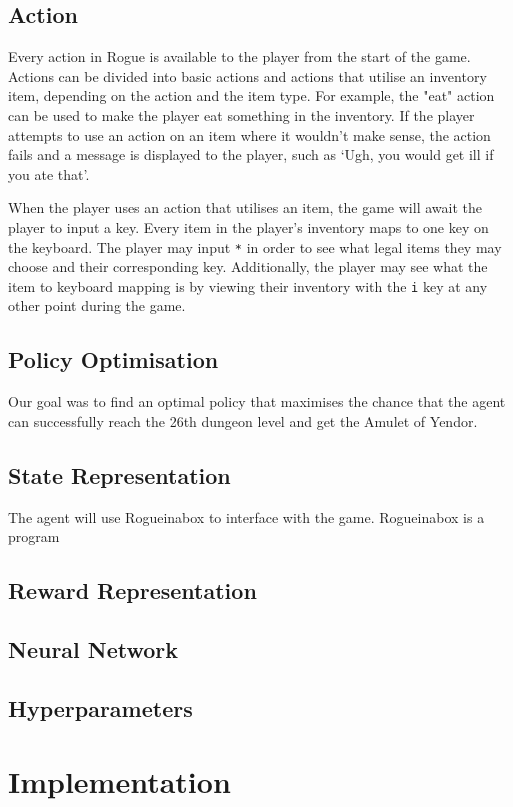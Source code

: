 \documentclass[11pt,a4paper]{article}
\begin{document}
    \subsection{Action}
    Every action in Rogue is available to the player from the start of the game. Actions can be divided into basic actions and actions that utilise an inventory item, depending on the action and the item type. For example, the "eat" action can be used to make the player eat something in the inventory. If the player attempts to use an action on an item where it wouldn't make sense, the action fails and a message is displayed to the player, such as `Ugh, you would get ill if you ate that'.

    When the player uses an action that utilises an item, the game will await the player to input a key. Every item in the player's inventory maps to one key on the keyboard. The player may input \texttt{*} in order to see what legal items they may choose and their corresponding key. Additionally, the player may see what the item to keyboard mapping is by viewing their inventory with the \texttt{i} key at any other point during the game.

    \subsection{Policy Optimisation}
    Our goal was to find an optimal policy that maximises the chance that the agent can successfully reach the 26th dungeon level and get the Amulet of Yendor.
    \subsection{State Representation}
    The agent will use Rogueinabox to interface with the game. Rogueinabox is a program
    \subsection{Reward Representation}
    \subsection{Neural Network}

    \subsection{Hyperparameters}




    \section{Implementation}
\end{document}
